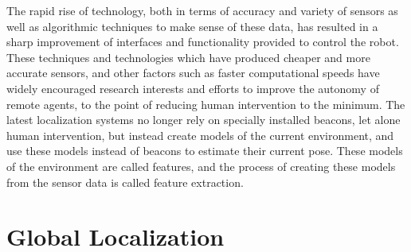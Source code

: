 The rapid rise of technology, both in terms of accuracy and variety of sensors as well as algorithmic techniques to make sense of these data,
has resulted in a sharp improvement of interfaces and functionality provided to control the robot. These techniques and technologies which
have produced cheaper and more accurate sensors, and other factors such as faster computational speeds have widely encouraged research
interests and efforts to improve the autonomy of remote agents, to the point of reducing human intervention to the minimum. The latest
localization systems no longer rely on specially installed beacons, let alone human intervention, but instead create models of the current 
environment, and use these models instead of beacons to estimate their current pose. These models of the environment are called features,
and the process of creating these models from the sensor data is called feature extraction. 





\section{Global Localization}
\label{sec:robo-global}
